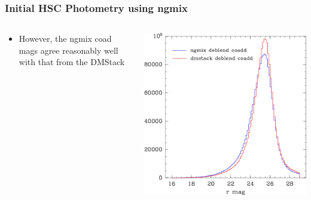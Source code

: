 \documentclass{beamer}
\begin{document}
\frame
{
    \frametitle{Initial HSC Photometry using ngmix}

 
    \begin{columns}
        \begin{column}{0.5\textwidth}
            \begin{itemize}

                \item However, the ngmix coad mags agree reasonably well with
                    that from the DMStack 

            \end{itemize}
        \end{column}
        \begin{column}{0.5\textwidth}
            \includegraphics[width=\textwidth]{hsc-mag-compare-dmstack.png}
        \end{column}
    \end{columns}
}
\end{document}
